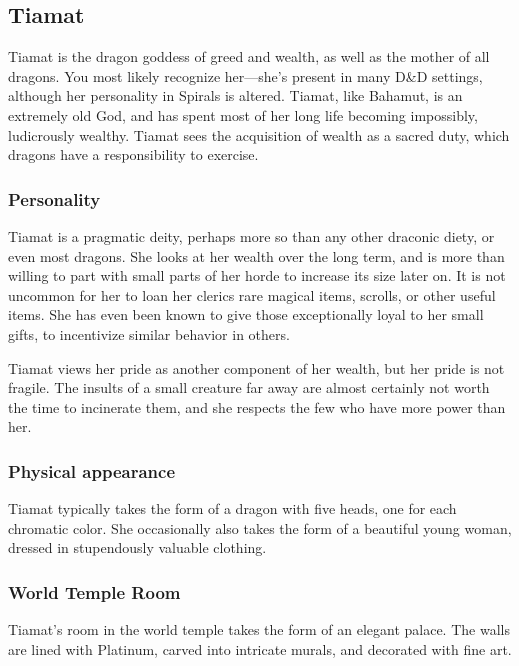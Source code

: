 \subsection*{Tiamat}
\begin{goddesc}
\end{goddesc}

Tiamat is the dragon goddess of greed and wealth, as well as the mother of all dragons.
You most likely recognize her---she's present in many D\&D settings, although her personality in Spirals is  altered.
Tiamat, like Bahamut, is an extremely old God, and has spent most of her long life becoming impossibly, ludicrously wealthy.
Tiamat sees the acquisition of wealth as a sacred duty, which dragons have a responsibility to exercise.

\subsubsection*{Personality}
Tiamat is a pragmatic deity, perhaps more so than any other draconic diety, or even most dragons.
She looks at her wealth over the long term, and is more than willing to part with small parts of her horde to increase its size later on.
It is not uncommon for her to loan her clerics rare magical items, scrolls, or other useful items.
She has even been known to give those exceptionally loyal to her small gifts, to incentivize similar behavior in others.

Tiamat views her pride as another component of her wealth, but her pride is not fragile.
The insults of a small creature far away are almost certainly not worth the time to incinerate them, and she respects the few who have more power than her.

\subsubsection*{Physical appearance}
Tiamat typically takes the form of a dragon with five heads, one for each chromatic color.
She occasionally also takes the form of a beautiful young woman, dressed in stupendously valuable clothing.

\subsubsection*{World Temple Room}
Tiamat's room in the world temple takes the form of an elegant palace.
The walls are lined with Platinum, carved into intricate murals, and decorated with fine art.

